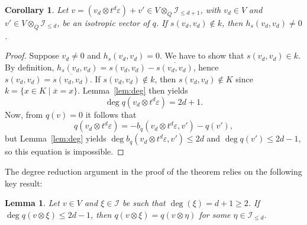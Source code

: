 \documentclass{amsart}
\newcommand{\calI}{\mathcal{I}}
\newtheorem{lemma}[prop]{Lemma}
\newtheorem{corol}[prop]{Corollary}
\theoremstyle{remark}
\begin{document}
\begin{corol}
  \label{corol:deg}
  Let $v=(v_{d}\otimes t^{d}\varepsilon)+v'\in
  V\otimes_Q\calI_{\leq d+1}$, with $v_{d}\in V$ and $v'\in
  V\otimes_Q\calI_{\leq d}$, be an isotropic vector of $q$.
  If
  $s(v_{d},v_{d})\notin k$, then $h_s(v_{d},v_{d})\neq0$.
\end{corol}

\begin{proof}
  Suppose $v_{d}\neq0$ and $h_s(v_{d},v_{d})=0$. We have to show
  that $s(v_{d},v_{d})\in k$. By definition, $h_s(v_{d},v_{d})
  = s(v_{d},v_{d})-\overline{s(v_{d},v_{d})}$, hence
  $s(v_{d},v_{d})=\overline{s(v_{d},v_{d})}$. If $s(v_d,v_d)\notin k$,
  then $s(v_d,v_d)\notin K$ since $k=\{x\in K\mid \overline
  x=x\}$. Lemma~\ref{lem:deg} then yields 
  \[
    \deg q(v_{d}\otimes t^{d}\varepsilon) = 2d+1.
  \]
  Now, from $q(v)=0$ it follows that
  \[
    q(v_{d}\otimes t^{d}\varepsilon) = -b_q(v_{d}\otimes
    t^{d}\varepsilon, v') - q(v'),
  \]
  but Lemma~\ref{lem:deg} yields $\deg b_q(v_{d}\otimes
  t^{d}\varepsilon,v')\leq 2d$ and $\deg q(v')
  \leq 2d-1$, so this equation is impossible.
\end{proof}

The degree reduction argument in the proof of the theorem
relies on the following key result:

\begin{lemma}
  \label{lem:key}
  Let $v\in V$ and $\xi\in\calI$ be such that $\deg(\xi)=d+1\geq2$. If
  $\deg q(v\otimes\xi)\leq2d-1$, then
  $q(v\otimes\xi) = q(v\otimes\eta)$ for some
  $\eta\in\calI_{\leq d}$.
\end{lemma}
\end{document}

